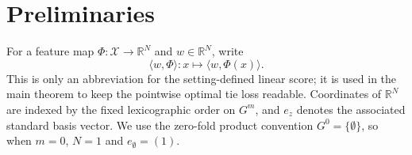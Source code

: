 \section{Preliminaries}\label{sec:preliminaries}

For a feature map \(\Phi:\mathcal X\to\mathbb R^N\) and
\(w\in\mathbb R^N\), write
\[
\langle w,\Phi\rangle:
x\longmapsto\langle w,\Phi(x)\rangle.
\]
This is only an abbreviation for the setting-defined linear score; it is
used in the main theorem to keep the pointwise optimal tie loss readable.
Coordinates of \(\mathbb R^N\) are indexed by the fixed lexicographic order
on \(G^m\), and \(e_z\) denotes the associated standard basis vector.  We
use the zero-fold product convention \(G^0=\{\emptyset\}\), so when
\(m=0\), \(N=1\) and \(e_{\emptyset}=(1)\).
